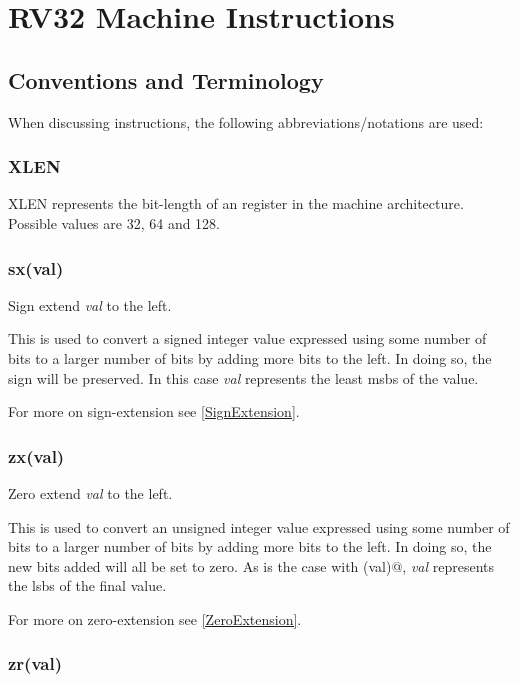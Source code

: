 
\newcommand\instructionHeader[1]{{\large\tt \string#1}}

\chapter{RV32 Machine Instructions}
\label{chapter:RV32}

\section{Conventions and Terminology}

When discussing instructions, the following abbreviations/notations are used:

\subsection{XLEN}
\label{XLEN}

XLEN represents the bit-length of an  register in the machine architecture.
Possible values are 32, 64 and 128.

\subsection{sx(val)}
\label{extension:sx}

Sign extend {\em val} to the left.

This is used to convert a signed integer value expressed using some number of
bits to a larger number of bits by adding more bits to the left.  In doing so,
the sign will be preserved.  In this case {\em val} represents the least
\acrshort{msb}s of the value.

For more on sign-extension see \autoref{SignExtension}.

\subsection{zx(val)}
\label{extension:zx}

Zero extend {\em val} to the left.

This is used to convert an unsigned integer value expressed using some number of
bits to a larger number of bits by adding more bits to the left.  In doing so,
the new bits added will all be set to zero.  As is the case with \verb@sx(val)@,
{\em val} represents the \acrshort{lsb}s of the final value.

For more on zero-extension see \autoref{ZeroExtension}.

\subsection{zr(val)}
\label{extension:zr}

